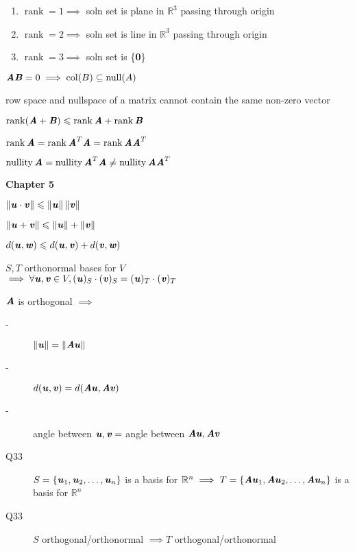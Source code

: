 \documentclass[landscape, a4paper]{article}
\let\leq\leqslant
\newcommand{\R}{\mathbb{R}}
\newcommand{\V}[1]{\textbf{\textit{#1}}}
\newcommand{\rank}{\operatorname{rank}}
\newcommand{\nullity}{\operatorname{nullity}}
\newcommand{\norm}[1]{\left\lVert#1\right\rVert}
\newcommand{\heading}[1]{
    \noindent\textbf{#1}
}
\begin{document}
\begin{multicols*}{4}
\begin{description}
\begin{enumerate}
                \item $\rank = 1\implies$ soln set is plane in $\R^3$ passing through origin
                \item $\rank = 2\implies$ soln set is line in $\R^3$ passing through origin
                \item $\rank = 3\implies$ soln set is \{\textbf{0}\}
            \end{enumerate}
        \item[Q20] $\V{AB} = 0\implies \operatorname{col}(B)\subseteq \operatorname{null}(A)$
        \item[Q21] row space and nullspace of a matrix cannot contain the same non-zero vector
        \item[Q23] $\rank (\V{A} + \V{B}) \leq \rank\V{A} + \rank\V{B}$
        \item[Q25] $\rank \V{A}=\rank \V{A}^T\V{A}=\rank \V{AA}^T$
        \item $\nullity \V{A}=\nullity \V{A}^T\V{A}\neq \nullity \V{AA}^T$
    \end{description}
    \heading{Chapter 5}
    \begin{description}
        \item[Cauchy-Schwarz] $\norm{\V{u}\cdot \V{v}}\leq \norm{\V{u}}\norm{\V{v}}$
        \item[Triangle] $\norm{\V{u} + \V{v}}\leq \norm{\V{u}} + \norm{\V{v}}$
        \item $d(\V{u}, \V{w})\leq d(\V{u}, \V{v}) + d(\V{v}, \V{w})$
        \item[Q31] $S, T$ orthonormal bases for $V$\\
            $\implies \forall \V{u}, \V{v}\in V, (\V{u})_S \cdot (\V{v})_S = (\V{u})_T\cdot (\V{v})_T$
        \item[Q32] $\V{A}$ is orthogonal $\implies$
            \begin{description}
                \item[-] $\norm{\V{u}} = \norm{\V{Au}}$
                \item[-] $d(\V{u}, \V{v}) = d(\V{Au}, \V{Av})$
                \item[-] angle between $\V{u},\V{v}=$ angle between $\V{Au}, \V{Av}$
                \item[Q33] $S=\{\V{u}_1, \V{u}_2, \hdots, \V{u}_n\}$ is a basis for $\R^n\implies T=\{\V{Au}_1, \V{Au}_2, \hdots, \V{Au}_n\}$ is a basis for $\R^n$
                \item[Q33] $S$ orthogonal/orthonormal $\implies T$ orthogonal/orthonormal

\end{description}
\end{description}
\end{multicols*}
\end{document}
